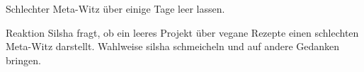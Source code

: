 \begin{recipe}{Schlechter Meta-Witz}
	 über einige Tage leer lassen.
	\item[Reaktion] Silsha fragt, ob ein leeres Projekt über vegane Rezepte einen schlechten Meta-Witz darstellt. Wahlweise silsha schmeicheln und auf andere Gedanken bringen.
\end{recipe}